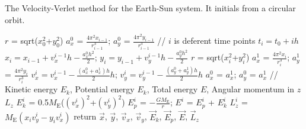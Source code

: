 \begin{algorithm}[tb]
	\label{alg::verlet}
	\caption{The Velocity-Verlet method for the Earth-Sun system. It initials from a circular orbit.}
	$r$ = sqrt($x_0^2$+$y_0^2$)\;
	$a_x^0$ = $\frac{4\pi^2x_{i-1}}{r_{i-1}^3}$;
    $a_y^0$ = $\frac{4\pi^2y_{i-1}}{r_{i-1}^3}$\;
	// $i$ is deferent time points $t_i=t_0+ih$\;
    {$x_{i} = x_{i-1} + v_x^{i-1}h - \frac{a_x^0h^2}{2}$;
    $y_{i} = y_{i-1} + v_y^{i-1}h - \frac{a_y^0h^2}{2}$\;
    $r$ = sqrt($x_i^2$+$y_i^2$)\;
    $a_x^1$ = $\frac{4\pi^2x_{i}}{r_{i}^3}$;
    $a_y^1$ = $\frac{4\pi^2y_{i}}{r_{i}^3}$\;
    $v_x^{i} = v_x^{i-1} - \frac{(a_x^0+a_x^1)h}{2}h$;
    $v_y^{i} = v_y^{i-1} - \frac{(a_y^0+a_y^1)h}{2}h$\;
	$a_x^0$ = $a_x^1$;
    $a_y^0$ = $a_x^1$\;
    // Kinetic energy $E_k$, Potential energy $E_k$, Total energy $E$, Angular momentum in $\hat{z}$ $L_z$\;
    $E_k^i$ = 0.5$M_{\mathrm{E}}$($(v_x^{i})^2$+$(v_y^{i})^2$)\;
    $E_p^i$ = $-\frac{GM_{\mathrm{E}}}{r}$;
    $E^i$ = $E_p^i$ + $E_k^i$\;
    $L_z^i$ = $M_{\mathrm{E}}(x_iv_y^{i}-y_iv_x^{i})$\;
    }
	return $\vec{x}$, $\vec{y}$, $\vec{v}_x$, $\vec{v}_y$, $\vec{E}_k$, $\vec{E}_p$, $\vec{E}$, $\vec{L}_z$\;
\end{algorithm}
